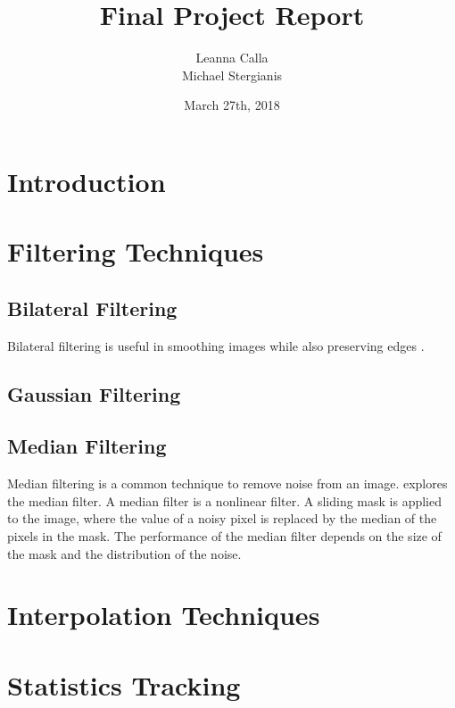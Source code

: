 \documentclass{article}
\title{Final Project Report}
\author{Leanna Calla \\ Michael Stergianis}
\date{March 27th, 2018}
\begin{document}
\maketitle

\section{Introduction}

\section{Filtering Techniques}
\subsection{Bilateral Filtering}
Bilateral filtering is useful in smoothing images while also
preserving edges \cite{Paris}.
\subsection{Gaussian Filtering}
\subsection{Median Filtering}
 Median filtering is a common technique to remove noise
from an image. \cite{Med} explores the median filter. A median filter is a nonlinear filter. A sliding mask
is applied to the image, where the value of a noisy pixel is replaced
by the median of the pixels in the mask. The performance of the median
filter depends on the size of the mask and the distribution of the
noise.
\section{Interpolation Techniques}

\section{Statistics Tracking}
\newpage
\printbibliography
\end{document}
